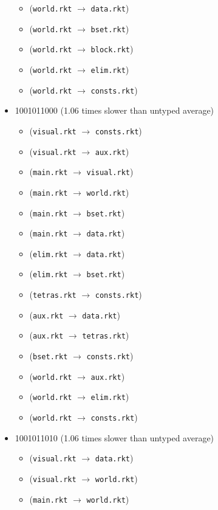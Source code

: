 \documentclass{article}
\newcommand{\mono}[1]{\texttt{#1}}
\begin{document}
\begin{itemize}
\begin{itemize}
  \item (\mono{world.rkt} $\rightarrow$ \mono{data.rkt})
  \item (\mono{world.rkt} $\rightarrow$ \mono{bset.rkt})
  \item (\mono{world.rkt} $\rightarrow$ \mono{block.rkt})
  \item (\mono{world.rkt} $\rightarrow$ \mono{elim.rkt})
  \item (\mono{world.rkt} $\rightarrow$ \mono{consts.rkt})
  \end{itemize}
\item 1001011000 (1.06 times slower than untyped average)
  \begin{itemize}
  \item (\mono{visual.rkt} $\rightarrow$ \mono{consts.rkt})
  \item (\mono{visual.rkt} $\rightarrow$ \mono{aux.rkt})
  \item (\mono{main.rkt} $\rightarrow$ \mono{visual.rkt})
  \item (\mono{main.rkt} $\rightarrow$ \mono{world.rkt})
  \item (\mono{main.rkt} $\rightarrow$ \mono{bset.rkt})
  \item (\mono{main.rkt} $\rightarrow$ \mono{data.rkt})
  \item (\mono{elim.rkt} $\rightarrow$ \mono{data.rkt})
  \item (\mono{elim.rkt} $\rightarrow$ \mono{bset.rkt})
  \item (\mono{tetras.rkt} $\rightarrow$ \mono{consts.rkt})
  \item (\mono{aux.rkt} $\rightarrow$ \mono{data.rkt})
  \item (\mono{aux.rkt} $\rightarrow$ \mono{tetras.rkt})
  \item (\mono{bset.rkt} $\rightarrow$ \mono{consts.rkt})
  \item (\mono{world.rkt} $\rightarrow$ \mono{aux.rkt})
  \item (\mono{world.rkt} $\rightarrow$ \mono{elim.rkt})
  \item (\mono{world.rkt} $\rightarrow$ \mono{consts.rkt})
  \end{itemize}
\item 1001011010 (1.06 times slower than untyped average)
  \begin{itemize}
  \item (\mono{visual.rkt} $\rightarrow$ \mono{data.rkt})
  \item (\mono{visual.rkt} $\rightarrow$ \mono{world.rkt})
  \item (\mono{main.rkt} $\rightarrow$ \mono{world.rkt})

\end{itemize}
\end{itemize}
\end{document}
